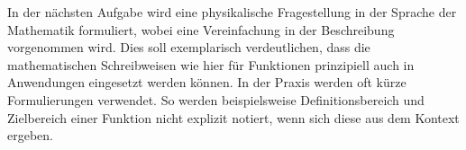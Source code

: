 \begin{MExercises}
%
%
%
%

In der nächsten Aufgabe wird eine physikalische Fragestellung in der Sprache
der Mathematik formuliert, wobei eine Vereinfachung in der Beschreibung 
vorgenommen wird. Dies soll exemplarisch verdeutlichen, dass die 
mathematischen Schreibweisen wie hier für Funktionen prinzipiell auch in 
Anwendungen eingesetzt werden können. In der Praxis werden oft kürze 
Formulierungen verwendet. So werden beispielsweise Definitionsbereich und 
Zielbereich einer Funktion nicht explizit notiert, wenn sich diese aus dem 
Kontext ergeben.


\end{MExercises}
